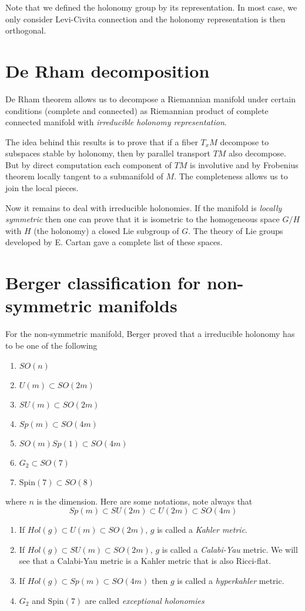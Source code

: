 \documentclass[11pt]{article}
\begin{document}
Note that we defined the holonomy group by its representation. In most case, we only consider
Levi-Civita connection and the holonomy representation is then orthogonal.
\section{De Rham decomposition}
\label{sec:orga617747}

De Rham theorem allows us to decompose a Riemannian manifold under certain conditions (complete and
connected) as Riemannian product of complete connected manifold with \emph{irreducible holonomy representation}.

The idea behind this results is to prove that if a fiber \(T_xM\) decompose to subspaces stable by
holonomy, then by parallel transport \(TM\) also decompose. But by direct computation each
component of \(TM\) is involutive and by Frobenius theorem locally tangent to a submanifold of
\(M\). The completeness allows us to join the local pieces.

Now it remains to deal with irreducible holonomies. If the manifold is \emph{locally symmetric} then one
can prove that it is isometric to the homogeneous space \(G/H\) with \(H\) (the holonomy) a closed Lie
subgroup of \(G\). The theory of Lie groups developed by E. Cartan gave a complete list of these spaces.


\section{Berger classification for non-symmetric manifolds}
\label{sec:org271eb6a}

For the non-symmetric manifold, Berger proved that a irreducible holonomy has to be one of the
following
\begin{enumerate}
\item \(SO(n)\)
\item \(U(m)\subset SO(2m)\)
\item \(SU(m)\subset SO(2m)\)
\item \(Sp(m) \subset SO(4m)\)
\item \(SO(m)Sp(1) \subset SO(4m)\)
\item \(G_2\subset SO(7)\)
\item \(\text{Spin}(7)\subset SO(8)\)
\end{enumerate}

where \(n\) is the dimension. Here are some notations, note always that
\[
Sp(m)\subset SU(2m)\subset U(2m)\subset SO(4m)
\]
\begin{enumerate}
\item If \(Hol(g)\subset U(m)\subset SO(2m)\), \(g\) is called a \emph{Kahler metric}.
\item If \(Hol(g)\subset SU(m)\subset SO(2m)\), \(g\) is called a \emph{Calabi-Yau} metric. We will see that a
Calabi-Yau metric is a Kahler metric that is also Ricci-flat.
\item If \(Hol(g)\subset Sp(m)\subset SO(4m)\) then \(g\) is called a \emph{hyperkahler} metric.
\item \(G_2\) and \(\text{Spin}(7)\) are called \emph{exceptional holonomies}
\end{enumerate}
\end{document}
